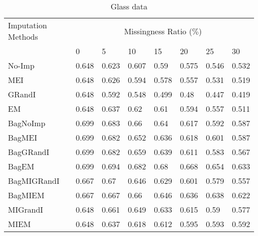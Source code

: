 \documentclass{iosart2c}
\begin{document}
\begin{table*}[htb]
\centering
\caption{Glass data}
\label{tab:glass}
    \begin{tabular}{|p{25mm}|l|l|l|l|l|l|l|} \hline
     Imputation Methods    & \multicolumn{7}{c|}{Missingness Ratio ($\%$)} \\ \cline{2-8}
                           &  0 & 5 & 10 & 15 & 20 & 25 & 30 \\ \hline
No-Imp & 0.648 & 0.623 & 0.607 & 0.59 & 0.575 & 0.546 & 0.532 \\ \hline
MEI & 0.648 & 0.626 & 0.594 & 0.578 & 0.557 & 0.531 & 0.519 \\ \hline
GRandI & 0.648 & 0.592 & 0.548 & 0.499 & 0.48 & 0.447 & 0.419 \\ \hline
EM & 0.648 & 0.637 & 0.62 & 0.61 & 0.594 & 0.557 & 0.511 \\ \hline \hline
BagNoImp & 0.699 & 0.683 & 0.66 & 0.64 & 0.617 & 0.592 & 0.587 \\ \hline
BagMEI & 0.699 & 0.682 & 0.652 & 0.636 & 0.618 & 0.601 & 0.587 \\ \hline
BagGRandI & 0.699 & 0.682 & 0.659 & 0.639 & 0.611 & 0.583 & 0.567 \\ \hline
BagEM & 0.699 & 0.694 & 0.682 & 0.68 & 0.668 & 0.654 & 0.633 \\ \hline \hline
BagMIGRandI & 0.667 & 0.67 & 0.646 & 0.629 & 0.601 & 0.579 & 0.557 \\ \hline
BagMIEM & 0.667 & 0.667 & 0.66 & 0.646 & 0.636 & 0.638 & 0.622 \\ \hline \hline
MIGrandI & 0.648 & 0.661 & 0.649 & 0.633 & 0.615 & 0.59 & 0.577 \\ \hline
MIEM & 0.648 & 0.637 & 0.618 & 0.612 & 0.595 & 0.593 & 0.592 \\ \hline
\end{tabular}
\end{table*}
\end{document}

